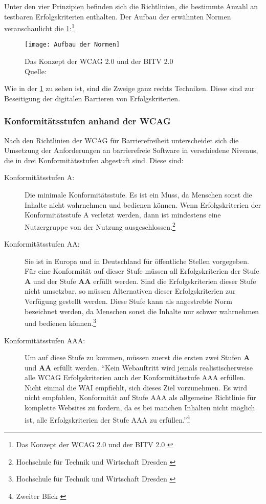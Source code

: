 Unter den vier Prinzipien befinden sich die Richtlinien, die bestimmte Anzahl an testbaren Erfolgskriterien enthalten. Der Aufbau der erwähnten Normen veranschaulicht die \cref{fig:Aufbau der Normen}:\footnote{Das Konzept der \ac{WCAG} 2.0 und der \ac{BITV} 2.0 \cite{AufbauDerNormen}}

\begin{figure}[H]
	\centering
	\texttt{[image: Aufbau der Normen]}
	\caption[Das Konzept der \ac{WCAG} 2.0 und der \ac{BITV} 2.0]{Das Konzept der \ac{WCAG} 2.0 und der \ac{BITV} 2.0 \\Quelle: \cite{AufbauDerNormen}}
	\label{fig:Aufbau der Normen}
\end{figure}

Wie in der \cref{fig:Aufbau der Normen} zu sehen ist, sind die Zweige ganz rechts Techniken. Diese sind zur Beseitigung der digitalen Barrieren von Erfolgskriterien.

\subsubsection{Konformitätsstufen anhand der \ac{WCAG}}
\label{subsubsec: Konformitätsstufen}
Nach den Richtlinien der \ac{WCAG} für Barrierefreiheit unterscheidet sich die Umsetzung der Anforderungen an barrierefreie Software in verschiedene Niveaus, die in drei Konformitätsstufen abgestuft sind. Diese sind:

\begin{description}
	\item [Konformitätsstufen A:] Die minimale Konformitätsstufe. Es ist ein Muss, da Menschen sonst die Inhalte nicht wahrnehmen und bedienen können. Wenn
	Erfolgskriterien der Konformitätsstufe A verletzt werden, dann ist mindestens eine Nutzergruppe von der Nutzung 
	ausgeschlossen.\footnote{Hochschule für Technik und Wirtschaft Dresden \cite{HV}}
	
	\item [Konformitätsstufen AA:] Sie ist in Europa und in Deutschland für öffentliche Stellen vorgegeben. Für eine Konformität auf dieser Stufe 
	müssen all Erfolgskriterien der Stufe \textbf{A} und der Stufe \textbf{AA} erfüllt werden. Sind die Erfolgskriterien dieser Stufe nicht umsetzbar, so
	müssen Alternativen dieser Erfolgskriterien
	zur Verfügung gestellt werden. Diese Stufe kann als angestrebte Norm bezeichnet werden, da Menschen sonst die Inhalte nur schwer wahrnehmen und bedienen 
	können.\footnote{Hochschule für Technik und Wirtschaft Dresden \cite{HV}}
	
	\item [Konformitätsstufen AAA:] Um auf diese Stufe zu kommen, müssen zuerst die ersten zwei Stufen \textbf{A} und \textbf{AA} erfüllt werden. "`Kein 
	Webauftritt wird jemals realistischerweise alle WCAG Erfolgskriterien auch der Konformitätsstufe AAA erfüllen. Nicht einmal die WAI empfiehlt, sich 
	dieses Ziel vorzunehmen. Es wird nicht empfohlen, Konformität auf Stufe AAA als allgemeine Richtlinie für komplette Websites zu fordern, da es bei manchen
	Inhalten nicht möglich ist, alle Erfolgskriterien der Stufe AAA zu erfüllen."'\footnote{Zweiter Blick \cite{ZweiterBlick}}
\end{description}

